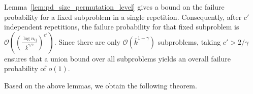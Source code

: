 \documentclass[journal]{IEEEtran}
\theoremstyle{definition}
\theoremstyle{definition}
\newcommand{\PP}{\mathbb{P}}
\newcommand{\kb}{\overline{k}}
\newcommand{\bigO}{\mathcal{O}}
\begin{document}




Lemma~\ref{lem:pd_size_permutation_level} gives a bound on the failure probability for a fixed subproblem in a single repetition. Consequently, after \(c'\) independent repetitions, the failure probability for that fixed subproblem is $\bigO\!\left((\frac{\log n_{ij}}{\kb^{\gamma/2}})^{c'}\right)$. Since there are only \(\bigO(\kb^{1-\gamma})\) subproblems, taking \(c' > 2/\gamma\) ensures that a union bound over all subproblems yields an overall failure probability of \(o(1)\).



Based on the above lemmas, we obtain the following theorem.
\end{document}
